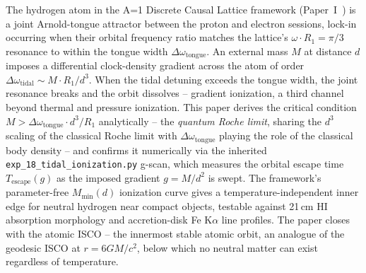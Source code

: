 
The hydrogen atom in the A=1 Discrete Causal Lattice framework
(Paper~I~\cite{menendez2026geometry}) is a joint Arnold-tongue
attractor between the proton and electron sessions, lock-in
occurring when their orbital frequency ratio matches the lattice's
$\omega \cdot R_1 = \pi/3$ resonance to within the tongue width
$\Delta\omega_\text{tongue}$.  An external mass $M$ at distance $d$
imposes a differential clock-density gradient across the atom of
order $\Delta\omega_\text{tidal} \sim M \cdot R_1 / d^3$.  When the
tidal detuning exceeds the tongue width, the joint resonance breaks
and the orbit dissolves -- gradient ionization, a third channel
beyond thermal and pressure ionization.  This paper derives the
critical condition $M > \Delta\omega_\text{tongue} \cdot d^3 / R_1$
analytically -- the \emph{quantum Roche limit}, sharing the $d^3$
scaling of the classical Roche limit with $\Delta\omega_\text{tongue}$
playing the role of the classical body density -- and confirms it
numerically via the inherited \texttt{exp\_18\_tidal\_ionization.py}
g-scan, which measures the orbital escape time $T_\text{escape}(g)$
as the imposed gradient $g = M / d^2$ is swept.  The framework's
parameter-free $M_\text{min}(d)$ ionization curve gives a
temperature-independent inner edge for neutral hydrogen near compact
objects, testable against 21\,cm HI absorption morphology and
accretion-disk Fe K$\alpha$ line profiles.  The paper closes with the
atomic ISCO -- the innermost stable atomic orbit, an analogue of the
geodesic ISCO at $r = 6GM/c^2$, below which no neutral matter can
exist regardless of temperature.
